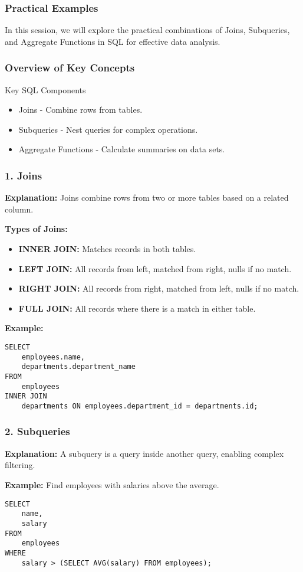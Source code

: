 \documentclass[aspectratio=169]{beamer}
\begin{document}
\begin{frame}[fragile]
    \frametitle{Practical Examples}
    In this session, we will explore the practical combinations of Joins, Subqueries, and Aggregate Functions in SQL for effective data analysis.
\end{frame}

\begin{frame}[fragile]
    \frametitle{Overview of Key Concepts}
    \begin{block}{Key SQL Components}
        \begin{itemize}
            \item Joins - Combine rows from tables.
            \item Subqueries - Nest queries for complex operations.
            \item Aggregate Functions - Calculate summaries on data sets.
        \end{itemize}
    \end{block}
\end{frame}

\begin{frame}[fragile]
    \frametitle{1. Joins}
    \textbf{Explanation:} Joins combine rows from two or more tables based on a related column.

    \textbf{Types of Joins:}
    \begin{itemize}
        \item \textbf{INNER JOIN:} Matches records in both tables.
        \item \textbf{LEFT JOIN:} All records from left, matched from right, nulls if no match.
        \item \textbf{RIGHT JOIN:} All records from right, matched from left, nulls if no match.
        \item \textbf{FULL JOIN:} All records where there is a match in either table.
    \end{itemize}

    \textbf{Example:}
    \begin{lstlisting}
SELECT 
    employees.name, 
    departments.department_name
FROM 
    employees
INNER JOIN 
    departments ON employees.department_id = departments.id;
    \end{lstlisting}
\end{frame}

\begin{frame}[fragile]
    \frametitle{2. Subqueries}
    \textbf{Explanation:} A subquery is a query inside another query, enabling complex filtering.

    \textbf{Example:} Find employees with salaries above the average.
    \begin{lstlisting}
SELECT 
    name, 
    salary 
FROM 
    employees 
WHERE 
    salary > (SELECT AVG(salary) FROM employees);
    \end{lstlisting}
\end{frame}
\end{document}
